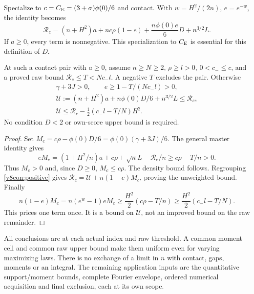 Specialize to $c=C_{\mathrm E}=(3+\sigma)\phi(0)/6$ and contact. With
$w=H^2/(2n)$, $e=e^{-w}$, the identity becomes
\begin{equation}\label{v8con:positive}
 \mathcal R_c=(n+H^2)a+nc\rho(1-e)+\frac{n\phi(0)e}{6}D+n^{3/2}L.
\end{equation}
If $a\ge0$, every term is nonnegative. This specialization to $C_{\mathrm E}$
is essential for this definition of $D$.

\begin{corollary}\label{v8con:license}
At such a contact pair with $a\ge0$, assume $n\ge N\ge2$,
$\rho\ge l>0$, $0<c_-\le c$, and a proved raw bound
$\mathcal R_c\le T<Nc_-l$. A negative $T$ excludes the pair.
Otherwise
\begin{gather*}
 \gamma+3J>0,\qquad e\ge1-T/(Nc_-l)>0,\\
 \mathcal U:=(n+H^2)a+n\phi(0)D/6+n^{3/2}L
       \le\mathcal R_c,\\
 \mathcal U\le\mathcal R_c-\tfrac12(c_-l-T/N)H^2.
\end{gather*}
No condition $D<2$ or own-score upper bound is required.
\end{corollary}
\begin{proof}
Set $M_c=c\rho-\phi(0)D/6=\phi(0)(\gamma+3J)/6$.
The general master identity gives
\[
 eM_c=(1+H^2/n)a+c\rho+\sqrt n L-\mathcal R_c/n
        \ge c\rho-T/n>0.
\]
Thus $M_c>0$ and, since $D\ge0$, $M_c\le c\rho$.
The density bound follows. Regrouping \eqref{v8con:positive} gives
$\mathcal R_c=\mathcal U+n(1-e)M_c$, proving the unweighted bound.
Finally
\[
 n(1-e)M_c=n(e^w-1)eM_c
 \ge\frac{H^2}{2}(c\rho-T/n)
 \ge\frac{H^2}{2}(c_-l-T/N).
\]
This prices one term once. It is a bound on $\mathcal U$, not an
improved bound on the raw remainder.
\end{proof}

All conclusions are at each actual index and raw threshold. A common
moment cell and common raw upper bound make them uniform even for
varying maximizing laws. There is no exchange of a limit in $n$ with
contact, gaps, moments or an integral. The remaining application inputs
are the quantitative support/moment bounds, complete Fourier envelope,
ordered numerical acquisition and final exclusion, each at its own scope.
